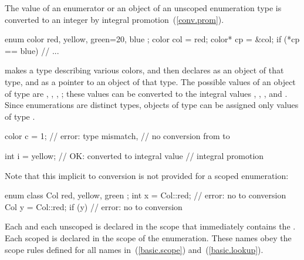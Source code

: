 \pnum
The value of an enumerator or an object of an unscoped enumeration type is
converted to an integer by integral promotion~(\ref{conv.prom}).
\enterexample

%
\begin{codeblock}
  enum color { red, yellow, green=20, blue };
  color col = red;
  color* cp = &col;
  if (*cp == blue)              // ...
\end{codeblock}

makes  a type describing various colors, and then declares
 as an object of that type, and  as a pointer to an
object of that type. The possible values of an object of type
 are , , ,
; these values can be converted to the integral values
, , , and . Since enumerations are
distinct types, objects of type  can be assigned only
values of type .

\begin{codeblock}
color c = 1;                    // error: type mismatch,
                                // no conversion from  to 

int i = yellow;                 // OK:  converted to integral value 
                                // integral promotion
\end{codeblock}

Note that this implicit  to 
conversion is not provided for a scoped enumeration:

\begin{codeblock}
enum class Col { red, yellow, green };
int x = Col::red;               // error: no  to  conversion
Col y = Col::red;
if (y) { }                      // error: no  to  conversion
\end{codeblock}

\exitexample

\pnum
{}%
Each  and each unscoped  is
declared in the scope that immediately contains the .
Each scoped  is declared in the scope of the
enumeration.
These names obey the scope rules defined for all names
in~(\ref{basic.scope}) and~(\ref{basic.lookup}).\enterexample

